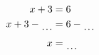 \documentclass[varwidth]{standalone}
\begin{document}
    \begin{varwidth}{0.25\paperwidth}
    \begin{align*}
    x + 3 &= 6\\
    x + 3 - \dotuline{\hspace{4mm}} &= 6 - \dotuline{\hspace{4mm}}\\
    x &= \dotuline{\hspace{4mm}}\\
\end{align*}
\end{varwidth}
\end{document}
